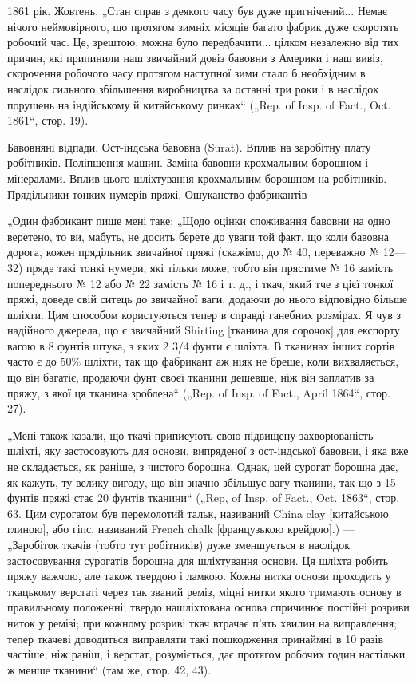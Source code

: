 1861 рік. Жовтень. „Стан справ з деякого часу був дуже
пригнічений... Немає нічого неймовірного, що протягом зимніх
місяців багато фабрик дуже скоротять робочий час. Це, зрештою,
можна було передбачити... цілком незалежно від тих причин,
які припинили наш звичайний довіз бавовни з Америки і наш вивіз,
скорочення робочого часу протягом наступної зими стало б
необхідним в наслідок сильного збільшення виробництва за
останні три роки і в наслідок порушень на індійському й китайському
ринках“ („Rep. of Insp. of Fact., Oct. 1861“, стор. 19).

Бавовняні відпади. Ост-індська бавовна (Surat). Вплив на заробітну плату
робітників. Поліпшення машин. Заміна бавовни крохмальним борошном і
мінералами. Вплив цього шліхтування крохмальним борошном на робітників.
Прядільники тонких нумерів пряжі. Ошуканство фабрикантів

„Один фабрикант пише мені таке: „Щодо оцінки споживання
бавовни на одно веретено, то ви, мабуть, не досить берете до
уваги той факт, що коли бавовна дорога, кожен прядільник
звичайної пряжі (скажімо, до № 40, переважно № 12—32) пряде
такі тонкі нумери, які тільки може, тобто він прястиме № 16
замість попереднього № 12 або № 22 замість № 16 і т. д.,
і ткач, який тче з цієї тонкої пряжі, доведе свій ситець до
звичайної ваги, додаючи до нього відповідно більше шліхти.
Цим способом користуються тепер в справді ганебних розмірах.
Я чув з надійного джерела, що є звичайний Shirting [тканина
для сорочок] для експорту вагою в 8 фунтів штука, з яких
2 3/4 фунти є шліхта. В тканинах інших сортів часто є до 50\%
шліхти, так що фабрикант аж ніяк не бреше, коли вихваляється,
що він багатіє, продаючи фунт своєї тканини дешевше, ніж він
заплатив за пряжу, з якої ця тканина зроблена“ („Rep. of Insp.
of Fact., April 1864“, стор. 27).

„Мені також казали, що ткачі приписують свою підвищену
захворюваність шліхті, яку застосовують для основи, випряденої
з ост-індської бавовни, і яка вже не складається, як раніше,
з чистого борошна. Однак, цей сурогат борошна дає, як кажуть,
ту велику вигоду, що він значно збільшує вагу тканини, так
що з 15 фунтів пряжі стає 20 фунтів тканини“ („Rep, of Insp.
of Fact., Oct. 1863“, стор. 63. Цим сурогатом був перемолотий
тальк, називаний China clay [китайською глиною], або гіпс, називаний
French chalk [французькою крейдою].) — „Заробіток ткачів
(тобто тут робітників) дуже зменшується в наслідок застосовування
сурогатів борошна для шліхтування основи. Ця шліхта
робить пряжу важчою, але також твердою і ламкою. Кожна
нитка основи проходить у ткацькому верстаті через так званий
реміз, міцні нитки якого тримають основу в правильному положенні;
твердо нашліхтована основа спричинює постійні розриви
ниток у ремізі; при кожному розриві ткач втрачає п’ять хвилин
на виправлення; тепер ткачеві доводиться виправляти такі
пошкодження принаймні в 10 разів частіше, ніж раніш, і верстат,
розуміється, дає протягом робочих годин настільки ж менше
тканини“ (там же, стор. 42, 43).

